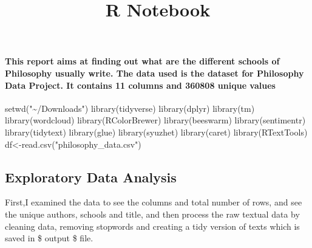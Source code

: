 \documentclass[
]{article}
\title{R Notebook}
\author{}
\date{\vspace{-2.5em}}
\newenvironment{Shaded}{\begin{snugshade}}{\end{snugshade}}
\newcommand{\FunctionTok}[1]{\textcolor[rgb]{0.00,0.00,0.00}{#1}}
\newcommand{\NormalTok}[1]{#1}
\newcommand{\OtherTok}[1]{\textcolor[rgb]{0.56,0.35,0.01}{#1}}
\newcommand{\StringTok}[1]{\textcolor[rgb]{0.31,0.60,0.02}{#1}}
\begin{document}
\maketitle

\hypertarget{this-report-aims-at-finding-out-what-are-the-different-schools-of-philosophy-usually-write.-the-data-used-is-the-dataset-for-philosophy-data-project.-it-contains-11-columns-and-360808-unique-values}{%
\paragraph{This report aims at finding out what are the different
schools of Philosophy usually write. The data used is the dataset for
Philosophy Data Project. It contains 11 columns and 360808 unique
values}\label{this-report-aims-at-finding-out-what-are-the-different-schools-of-philosophy-usually-write.-the-data-used-is-the-dataset-for-philosophy-data-project.-it-contains-11-columns-and-360808-unique-values}}

\begin{Shaded}
\begin{Highlighting}[]
\FunctionTok{setwd}\NormalTok{(}\StringTok{"\textasciitilde{}/Downloads"}\NormalTok{)}
\FunctionTok{library}\NormalTok{(tidyverse)}
\FunctionTok{library}\NormalTok{(dplyr)}
\FunctionTok{library}\NormalTok{(tm)}
\FunctionTok{library}\NormalTok{(wordcloud)}
\FunctionTok{library}\NormalTok{(RColorBrewer)}
\FunctionTok{library}\NormalTok{(beeswarm)}
\FunctionTok{library}\NormalTok{(sentimentr)}
\FunctionTok{library}\NormalTok{(tidytext)}
\FunctionTok{library}\NormalTok{(glue)}
\FunctionTok{library}\NormalTok{(syuzhet)}
\FunctionTok{library}\NormalTok{(caret)}
\FunctionTok{library}\NormalTok{(RTextTools)}
\NormalTok{df}\OtherTok{\textless{}{-}}\FunctionTok{read.csv}\NormalTok{(}\StringTok{"philosophy\_data.csv"}\NormalTok{)}
\end{Highlighting}
\end{Shaded}

\hypertarget{exploratory-data-analysis}{%
\subsection{Exploratory Data Analysis}\label{exploratory-data-analysis}}

First,I examined the data to see the columns and total number of rows,
and see the unique authors, schools and title, and then process the raw
textual data by cleaning data, removing stopwords and creating a tidy
version of texts which is saved in \$ output \$ file.
\end{document}
